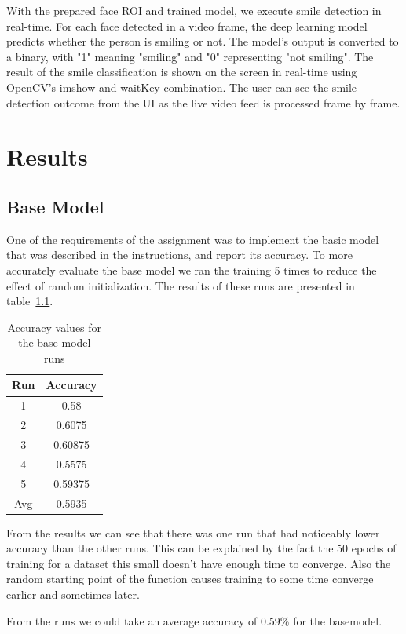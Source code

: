 \documentclass[12pt,a4paper,english
]{tunithesis}
\begin{document}
With the prepared face ROI and trained model, we execute smile detection in real-time. For each face detected in a video frame, the deep learning model predicts whether the person is smiling or not. The model's output is converted to a binary, with "1" meaning "smiling" and "0" representing "not smiling". The result of the smile classification is shown on the screen in real-time using OpenCV's imshow and waitKey combination. The user can see the smile detection outcome from the UI as the live video feed is processed frame by frame.


\chapter{Results}
\label{sec:results}

\section{Base Model}
One of the requirements of the assignment was to implement the basic model that was described in the instructions, and report its accuracy. To more accurately evaluate the base model we ran the training 5 times to reduce the effect of random initialization. The results of these runs are presented in table~\ref{tab:basemodel}.

\begin{table}[h!]
\centering
\caption{Accuracy values for the base model runs}
\begin{tabular}{|c|c|}
\hline
Run & Accuracy \\
\hline
1 & 0.58 \\
2 & 0.6075 \\
3 & 0.60875 \\
4 & 0.5575 \\
5 & 0.59375 \\
\hline
Avg & 0.5935 \\
\hline
\end{tabular}
\label{tab:basemodel}
\end{table}

From the results we can see that there was one run that had noticeably lower accuracy than the other runs. This can be explained by the fact the 50 epochs of training for a dataset this small doesn't have enough time to converge. Also the random starting point of the function causes training to some time converge earlier and sometimes later.

From the runs we could take an average accuracy of 0.59\% for the basemodel.
\end{document}

